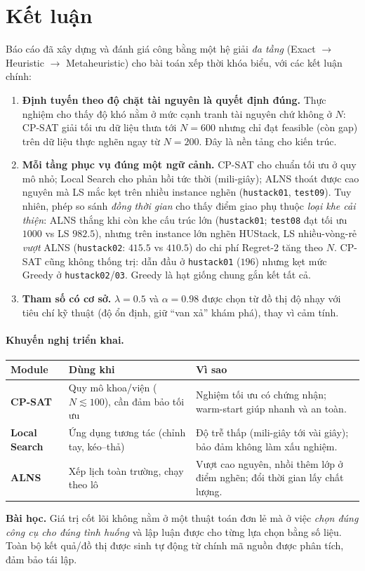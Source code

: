 \section{Kết luận}
\label{sec:conclusion}

Báo cáo đã xây dựng và đánh giá công bằng một hệ giải \emph{đa tầng}
(Exact $\to$ Heuristic $\to$ Metaheuristic) cho bài toán xếp thời khóa biểu, với
các kết luận chính:

\begin{enumerate}[label=(\arabic*),leftmargin=*]
  \item \textbf{Định tuyến theo độ chặt tài nguyên là quyết định đúng.} Thực nghiệm
  cho thấy độ khó nằm ở mức cạnh tranh tài nguyên chứ không ở $N$: CP-SAT giải tối
  ưu dữ liệu thưa tới $N{=}600$ nhưng chỉ đạt feasible (còn gap) trên dữ liệu thực
  nghẽn ngay từ $N{=}200$. Đây là nền tảng cho kiến trúc.
  \item \textbf{Mỗi tầng phục vụ đúng một ngữ cảnh.}
  CP-SAT cho chuẩn tối ưu ở quy mô nhỏ; Local Search cho phản hồi tức thời
  (mili-giây); ALNS thoát được cao nguyên mà LS mắc kẹt trên nhiều instance nghẽn
  (\texttt{hustack01}, \texttt{test09}). Tuy nhiên, phép so sánh \emph{đồng thời
  gian} cho thấy điểm giao phụ thuộc \emph{loại khe cải thiện}: ALNS thắng khi còn
  khe cấu trúc lớn (\texttt{hustack01}; \texttt{test08} đạt tối ưu $1000$ vs LS
  $982.5$), nhưng trên instance lớn nghẽn HUStack, LS nhiều-vòng-rẻ \emph{vượt} ALNS
  (\texttt{hustack02}: $415.5$ vs $410.5$) do chi phí Regret-2 tăng theo $N$. CP-SAT
  cũng không thống trị: dẫn đầu ở \texttt{hustack01} ($196$) nhưng kẹt mức Greedy ở
  \texttt{hustack02}/\texttt{03}. Greedy là hạt giống chung gắn kết tất cả.
  \item \textbf{Tham số có cơ sở.} $\lambda{=}0.5$ và
  $\alpha{=}0.98$ được chọn từ đồ thị độ nhạy với tiêu chí kỹ thuật (độ ổn định,
  giữ ``van xả'' khám phá), thay vì cảm tính.
\end{enumerate}

\paragraph{Khuyến nghị triển khai.}
\begin{center}
\renewcommand{\arraystretch}{1.3}
\begin{tabular}{p{2.7cm} p{4.8cm} p{6.0cm}}
\toprule
\textbf{Module} & \textbf{Dùng khi} & \textbf{Vì sao} \\
\midrule
\textbf{CP-SAT} & Quy mô khoa/viện ($N\lesssim 100$), cần đảm bảo tối ưu &
Nghiệm tối ưu có chứng nhận; warm-start giúp nhanh và an toàn. \\
\textbf{Local Search} & Ứng dụng tương tác (chỉnh tay, kéo--thả) &
Độ trễ thấp (mili-giây tới vài giây); bảo đảm không làm xấu nghiệm. \\
\textbf{ALNS} & Xếp lịch toàn trường, chạy theo lô &
Vượt cao nguyên, nhồi thêm lớp ở điểm nghẽn; đổi thời gian lấy chất lượng. \\
\bottomrule
\end{tabular}
\end{center}

\noindent \textbf{Bài học.} Giá trị cốt lõi không nằm ở một thuật toán đơn lẻ mà ở
việc \emph{chọn đúng công cụ cho đúng tình huống} và lập luận được cho từng lựa
chọn bằng số liệu. Toàn bộ kết quả/đồ thị được sinh tự động từ chính mã nguồn được
phân tích, đảm bảo tái lập.
